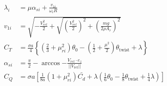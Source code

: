 \begin{subequations}

        \begin{align}
            \lambda_{i} &= \mu\alpha_{si} + \frac{v_{1i}}{\omega_{i} R} \\
%
            v_{1i} &= \sqrt{
                -\frac{V_{rel}^{2}}{2} + \sqrt{
                    \left( \frac{V_{rel}^{2}}{2} \right)^{2}
                    + \left( \frac{mg}{2 \rho A_{r}} \right)^{2}
                }
            }\\
%
            C_{T} &= \frac{\sigma a}{4}\left\lbrace
                  \left( \frac{2}{3} + \mu_{ri}^{2} \right) \theta_{0}
                - \left( \frac{1}{2} + \frac{\mu^{2}}{2} \right) \theta_{\text{twist}}
                + \lambda
            \right\rbrace \\
%
            \alpha_{si} &= \frac{\pi}{2} - \arccos{ -\frac{V_{rel} \cdot e_{z}}{||V_{\text{rel}}||} } \\
%
%
            C_{Q} &= \sigma a \left[
                \frac{1}{8a}\left( 1 + \mu_{ri}^{2} \right) \bar{C_{d}}
                + \lambda\left(
                    \frac{1}{6}\theta_{0}
                    - \frac{1}{8}\theta_{\text{twist}}
                    + \frac{1}{4}\lambda
                    \right)
                \right]
        \end{align}
    \end{subequations}

